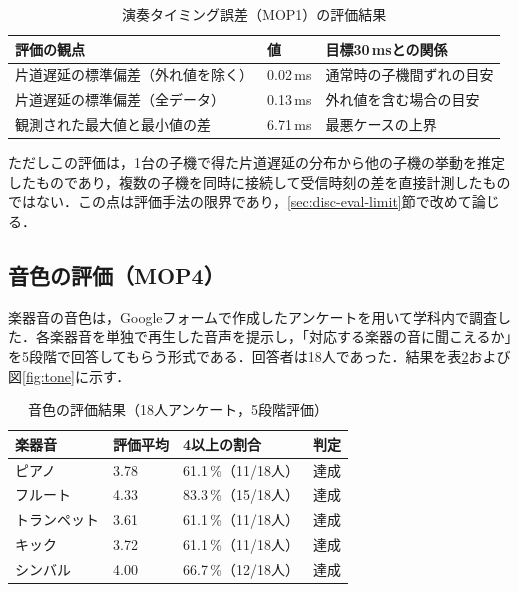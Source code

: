\documentclass[uplatex,dvipdfmx]{jlreq}
\begin{document}
\begin{table}[tb]
\caption{演奏タイミング誤差（MOP1）の評価結果}
\label{tab:mop1-result}
\begin{center}
\small
\begin{tabular}{lll}
\hline
評価の観点 & 値 & 目標30\,msとの関係 \\
\hline
片道遅延の標準偏差（外れ値を除く） & 0.02\,ms & 通常時の子機間ずれの目安 \\
片道遅延の標準偏差（全データ） & 0.13\,ms & 外れ値を含む場合の目安 \\
観測された最大値と最小値の差 & 6.71\,ms & 最悪ケースの上界 \\
\hline
\end{tabular}
\end{center}
\end{table}

ただしこの評価は，1台の子機で得た片道遅延の分布から他の子機の挙動を推定したものであり，複数の子機を同時に接続して受信時刻の差を直接計測したものではない．この点は評価手法の限界であり，\ref{sec:disc-eval-limit}節で改めて論じる．

\subsection{音色の評価（MOP4）}

楽器音の音色は，Googleフォームで作成したアンケートを用いて学科内で調査した．各楽器音を単独で再生した音声を提示し，「対応する楽器の音に聞こえるか」を5段階で回答してもらう形式である．回答者は18人であった．結果を表\ref{tab:tone-result}および図\ref{fig:tone}に示す．

\begin{table}[tb]
\caption{音色の評価結果（18人アンケート，5段階評価）}
\label{tab:tone-result}
\begin{center}
\small
\begin{tabular}{llll}
\hline
楽器音 & 評価平均 & 4以上の割合 & 判定 \\
\hline
ピアノ & 3.78 & 61.1\,\%（11/18人） & 達成 \\
フルート & 4.33 & 83.3\,\%（15/18人） & 達成 \\
トランペット & 3.61 & 61.1\,\%（11/18人） & 達成 \\
キック & 3.72 & 61.1\,\%（11/18人） & 達成 \\
シンバル & 4.00 & 66.7\,\%（12/18人） & 達成 \\
\hline
\end{tabular}
\end{center}
\end{table}
\end{document}
